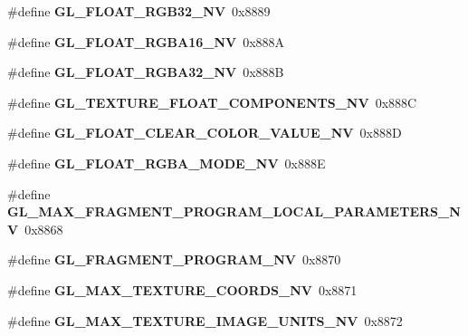 \begin{DoxyCompactItemize}
\item 
\#define {\bfseries G\+L\+\_\+\+F\+L\+O\+A\+T\+\_\+\+R\+G\+B32\+\_\+\+N\+V}~0x8889\label{_s_d_l__opengl_8h_a349a351d9f755087db8471f66bb9716b}

\item 
\#define {\bfseries G\+L\+\_\+\+F\+L\+O\+A\+T\+\_\+\+R\+G\+B\+A16\+\_\+\+N\+V}~0x888\+A\label{_s_d_l__opengl_8h_a43c163fe9371f449e6d00ff2297e2aa1}

\item 
\#define {\bfseries G\+L\+\_\+\+F\+L\+O\+A\+T\+\_\+\+R\+G\+B\+A32\+\_\+\+N\+V}~0x888\+B\label{_s_d_l__opengl_8h_a945fc420f26ed5f1941022278c5ffd57}

\item 
\#define {\bfseries G\+L\+\_\+\+T\+E\+X\+T\+U\+R\+E\+\_\+\+F\+L\+O\+A\+T\+\_\+\+C\+O\+M\+P\+O\+N\+E\+N\+T\+S\+\_\+\+N\+V}~0x888\+C\label{_s_d_l__opengl_8h_a52ee33087e62bbd7a5a39cdcbcdd2dc9}

\item 
\#define {\bfseries G\+L\+\_\+\+F\+L\+O\+A\+T\+\_\+\+C\+L\+E\+A\+R\+\_\+\+C\+O\+L\+O\+R\+\_\+\+V\+A\+L\+U\+E\+\_\+\+N\+V}~0x888\+D\label{_s_d_l__opengl_8h_a50347bada2fb52e79f637746919d42f6}

\item 
\#define {\bfseries G\+L\+\_\+\+F\+L\+O\+A\+T\+\_\+\+R\+G\+B\+A\+\_\+\+M\+O\+D\+E\+\_\+\+N\+V}~0x888\+E\label{_s_d_l__opengl_8h_ab02db357e1be6e3314b483f3e11dbc2c}

\item 
\#define {\bfseries G\+L\+\_\+\+M\+A\+X\+\_\+\+F\+R\+A\+G\+M\+E\+N\+T\+\_\+\+P\+R\+O\+G\+R\+A\+M\+\_\+\+L\+O\+C\+A\+L\+\_\+\+P\+A\+R\+A\+M\+E\+T\+E\+R\+S\+\_\+\+N\+V}~0x8868\label{_s_d_l__opengl_8h_a8a1628d90938a683ed20576ed195cc82}

\item 
\#define {\bfseries G\+L\+\_\+\+F\+R\+A\+G\+M\+E\+N\+T\+\_\+\+P\+R\+O\+G\+R\+A\+M\+\_\+\+N\+V}~0x8870\label{_s_d_l__opengl_8h_abbd63448f69924f0c2f93ec249dbe6d5}

\item 
\#define {\bfseries G\+L\+\_\+\+M\+A\+X\+\_\+\+T\+E\+X\+T\+U\+R\+E\+\_\+\+C\+O\+O\+R\+D\+S\+\_\+\+N\+V}~0x8871\label{_s_d_l__opengl_8h_a4a5bc19a15acd2179c765406805f26a1}

\item 
\#define {\bfseries G\+L\+\_\+\+M\+A\+X\+\_\+\+T\+E\+X\+T\+U\+R\+E\+\_\+\+I\+M\+A\+G\+E\+\_\+\+U\+N\+I\+T\+S\+\_\+\+N\+V}~0x8872\label{_s_d_l__opengl_8h_a8af9643787290034aed7729a47baa1c9}


\end{DoxyCompactItemize}
